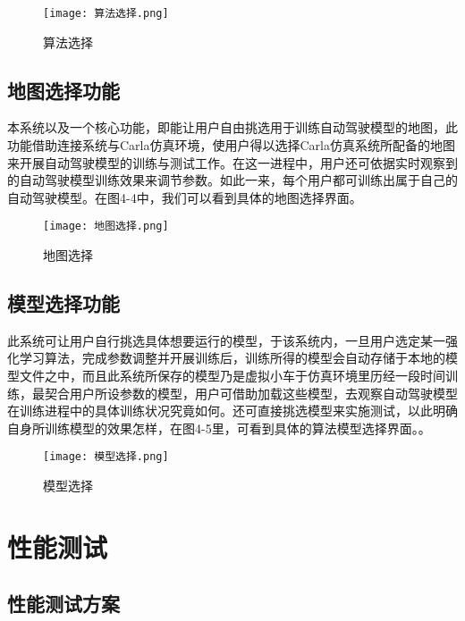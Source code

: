 \begin{figure}[hbt]
	\centering
	\texttt{[image: 算法选择.png]}
	\caption{算法选择}
	\label{f.example}
\end{figure}

\subsection{地图选择功能}
本系统以及一个核心功能，即能让用户自由挑选用于训练自动驾驶模型的地图，此功能借助连接系统与Carla仿真环境，使用户得以选择Carla仿真系统所配备的地图来开展自动驾驶模型的训练与测试工作。在这一进程中，用户还可依据实时观察到的自动驾驶模型训练效果来调节参数。如此一来，每个用户都可训练出属于自己的自动驾驶模型。在图4-4中，我们可以看到具体的地图选择界面。

\begin{figure}[hbt]
	\centering
	\texttt{[image: 地图选择.png]}
	\caption{地图选择}
	\label{f.example}
\end{figure}

\subsection{模型选择功能}

此系统可让用户自行挑选具体想要运行的模型，于该系统内，一旦用户选定某一强化学习算法，完成参数调整并开展训练后，训练所得的模型会自动存储于本地的模型文件之中，而且此系统所保存的模型乃是虚拟小车于仿真环境里历经一段时间训练，最契合用户所设参数的模型，用户可借助加载这些模型，去观察自动驾驶模型在训练进程中的具体训练状况究竟如何。还可直接挑选模型来实施测试，以此明确自身所训练模型的效果怎样，在图4-5里，可看到具体的算法模型选择界面。。

\begin{figure}[hbt]
	\centering
	\texttt{[image: 模型选择.png]}
	\caption{模型选择}
	\label{f.example}
\end{figure}

\section{性能测试}
\subsection{性能测试方案}

